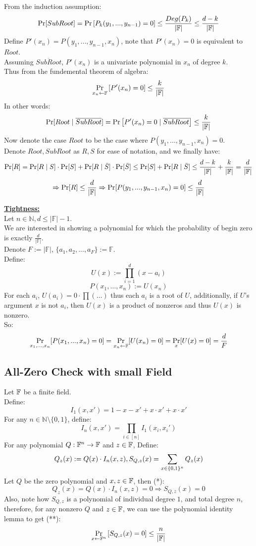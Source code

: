 From the induction assumption:
\[
    \operatorname*{Pr}[SubRoot]=\operatorname*{Pr}\left[P_k(y_1,...,y_{n-1})=0\right]
    \leq \frac{Deg(P_k)}{|\mathbb{F}|}
    \leq \frac{d-k}{|\mathbb{F}|}
\]
Define $P'(x_n)=P(y_1,...,y_{n-1},x_n)$, note that $P'(x_n)=0$ is equivalent to $Root$.\\
Assuming $\overline{SubRoot}$, $P'(x_n)$ is a univariate polynomial in $x_n$ of degree $k$.\\
Thus from the fundemental theorem of algebra:
\[
    \operatorname*{Pr}_{x_n\leftarrow \mathbb{F}}\left[P'(x_n)=0\right]
    \leq \frac{k}{|\mathbb{F}|}
\]
    In other words:
\[
    \operatorname*{Pr}[Root\mid \overline{SubRoot}]
    =\operatorname*{Pr}\left[P'(x_n)=0
    \mid \overline{SubRoot}\right]
    \leq \frac{k}{|\mathbb{F}|}    
\]
Now denote the case $Root$ to be the case where $P(y_1,...,y_{n-1}, x_n)=0$.\\
Denote $Root, SubRoot$ as $R,S$ for ease of notation, and we finally have:
\[
    \operatorname*{Pr}[R]=\operatorname*{Pr}[R\mid S]\cdot\operatorname*{Pr}[S]+\operatorname*{Pr}[R\mid \bar{S}]\cdot\operatorname*{Pr}[\bar{S}]
    \leq \operatorname*{Pr}[S]+\operatorname*{Pr}[R\mid \bar{S}]\leq \frac{d-k}{|\mathbb{F}|}+\frac{k}{|\mathbb{F}|}= \frac{d}{|\mathbb{F}|}
\]\[
    \Rightarrow \operatorname*{Pr}[R]\leq \frac{d}{|\mathbb{F}|}
    \Rightarrow \operatorname*{Pr}[P(y_1,...,y_{n-1},x_n)=0]\leq \frac{d}{|\mathbb{F}|}
\]

\underline{\textbf{Tightness:}}\\
Let $n\in\mathbb{N}, d\leq|\mathbb{F}|-1$.\\
We are interested in showing a polynomial for which the probability
of begin zero is exactly $\frac{d}{|\mathbb{F}|}$.\\
Denote $F:=|\mathbb{F}|$, $\{a_1,a_2,...,a_F\}:=\mathbb{F}$.\\
Define:
\[
    U(x):=\prod_{i=1}^d(x-a_i)    
\]
\[
    P(x_1,...,x_n):=U(x_n)    
\]
For each $a_i$, $U(a_i)=0\cdot\prod(\dots)$ thus each $a_i$ is a root of $U$,
additionally, if $U$'s argument $x$ is not $a_i$, then $U(x)$ is a product of nonzeros and thus $U(x)$ is nonzero.\\
So:
\[
    \operatorname*{Pr}_{x_1,...,x_n}[P(x_1,...,x_n)=0]=\operatorname*{Pr}_{x_n\leftarrow \mathbb{F}}[U(x_n)=0]
    =\operatorname*{Pr}_x[U(x)=0]=\frac{d}{F}
\]

\subsection{All-Zero Check with small Field}
Let $\mathbb{F}$ be a finite field.\\
Define:
\[
    I_1(x,x')=1-x-x'+x\cdot x'+x\cdot x'
\]  
For any $n\in\mathbb{N}\setminus\{0,1\}$, define:
\[
    I_n(x,x')=
    \prod_{i\in[n]}I_1(x_i,x_i')
\]
For any polynomial $Q:\mathbb{F}^n\rightarrow\mathbb{F}$ and $z\in\mathbb{F}$, Define:
\[
    Q_z(x):=Q(x)\cdot I_n(x,z), S_{Q,z}(x)=\sum_{x\in\{0,1\}^n}Q_z(x)
\]
Let $Q$ be the zero polynomial and $x,z\in\mathbb{F}$,
then (*):
\[
    Q_z(x)=Q(x)\cdot I_n(x,z)=0
    \Rightarrow S_{Q,z}(x)=0
\] 
Also, note how $S_{Q,z}$ is a polynomial of individual degree $1$, and total degree $n$,
therefore, for any nonzero $Q$ and $z\in\mathbb{F}$,
we can use the polynomial identity lemma to get (**):
\[
    \operatorname*{Pr}_{x\leftarrow\mathbb{F}^n}\left[S_{Q,z}(x)=0\right]\leq\frac{n}{|\mathbb{F}|}
\]


